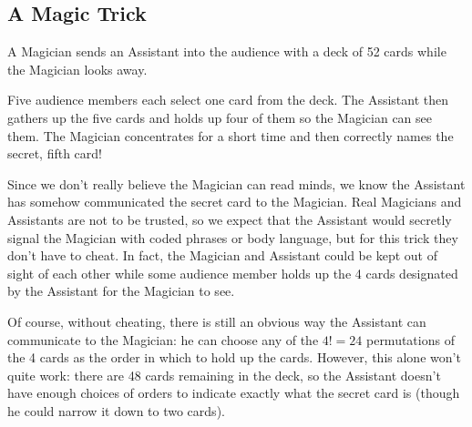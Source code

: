 
\subsection{A Magic Trick}\label{cardmagic_sec}


A Magician sends an Assistant into the audience with a deck of 52
cards while the Magician looks away.

Five audience members each select one card from the deck.  The Assistant
then gathers up the five cards and holds up four of them so the Magician
can see them.  The Magician concentrates for a short time and then
correctly names the secret, fifth card!

Since we don't really believe the Magician can read minds, we know the
Assistant has somehow communicated the secret card to the Magician.  Real
Magicians and Assistants are not to be trusted, so we expect that the
Assistant would secretly signal the Magician with coded phrases or body
language, but for this trick they don't have to cheat.  In fact, the
Magician and Assistant could be kept out of sight of each other while some
audience member holds up the 4 cards designated by the Assistant for the
Magician to see.

Of course, without cheating, there is still an obvious way the Assistant
can communicate to the Magician: he can choose any of the $4! = 24$
permutations of the 4 cards as the order in which to hold up the cards.
However, this alone won't quite work: there are 48 cards remaining in the
deck, so the Assistant doesn't have enough choices of orders to indicate
exactly what the secret card is (though he could narrow it down to two
cards).

